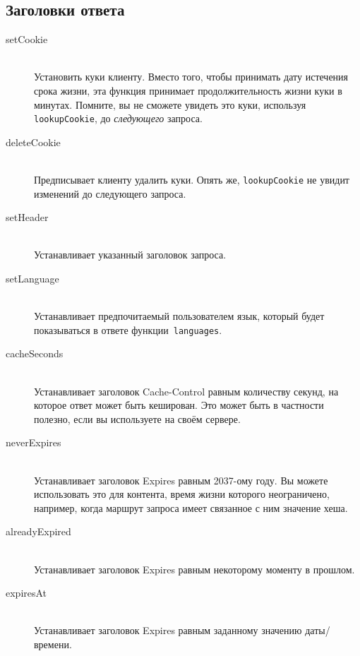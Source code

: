 \subsection{Заголовки ответа}
\begin{description}
\item[setCookie] \hfill \\
Установить куки клиенту. Вместо того, чтобы принимать дату истечения
срока жизни, эта функция принимает продолжительность жизни куки в
минутах. Помните, вы не сможете увидеть это куки, используя
\lstinline!lookupCookie!, до \emph{следующего} запроса.

\item[deleteCookie] \hfill \\
Предписывает клиенту удалить куки. Опять же, \lstinline!lookupCookie! не
увидит изменений до следующего запроса.

\item[setHeader] \hfill \\
Устанавливает указанный заголовок запроса.

\item[setLanguage] \hfill \\
Устанавливает предпочитаемый пользователем язык, который будет
показываться в ответе функции~\lstinline!languages!.

\item[cacheSeconds] \hfill \\
  Устанавливает заголовок Cache-Control равным количеству секунд, на которое
  ответ может быть кеширован. Это может быть в частности полезно, если вы используете
   на своём сервере.

\item[neverExpires] \hfill \\
  Устанавливает заголовок Expires равным 2037-ому году. Вы можете использовать
  это для контента, время жизни которого неограничено, например, когда маршрут запроса
  имеет связанное с ним значение хеша.

\item[alreadyExpired] \hfill \\
Устанавливает заголовок Expires равным некоторому моменту в прошлом.

\item[expiresAt] \hfill \\
Устанавливает заголовок Expires равным заданному значению даты/времени.
\end{description}

